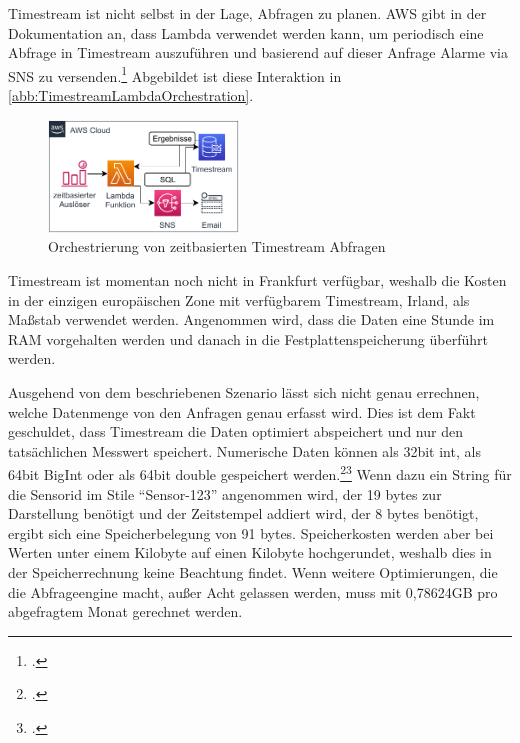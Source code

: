 Timestream ist nicht selbst in der Lage, Abfragen zu planen. \ac{AWS} gibt in der Dokumentation an, dass Lambda verwendet werden kann, um periodisch eine Abfrage in Timestream auszuführen und basierend auf dieser Anfrage Alarme via \ac{SNS} zu versenden.\footcite[Vgl.][]{AmazonWebServicesInc..o.J.ag} Abgebildet ist diese Interaktion in \autoref{abb:TimestreamLambdaOrchestration}.


\begin{figure}[H]
\centering
\includegraphics[width=0.45\textwidth]{graphics/Lambda-Timestream-Orchestration.pdf}
\caption{Orchestrierung von zeitbasierten Timestream Abfragen}
\label{abb:TimestreamLambdaOrchestration}
\end{figure}

Timestream ist momentan noch nicht in Frankfurt verfügbar, weshalb die Kosten in der einzigen europäischen Zone mit verfügbarem Timestream, Irland, als Maßstab verwendet werden. Angenommen wird, dass die Daten eine Stunde im \ac{RAM} vorgehalten werden und danach in die Festplattenspeicherung überführt werden.

Ausgehend von dem beschriebenen Szenario lässt sich nicht genau errechnen, welche Datenmenge von den Anfragen genau erfasst wird. Dies ist dem Fakt geschuldet, dass Timestream die Daten optimiert abspeichert und nur den tatsächlichen Messwert speichert. Numerische Daten können als 32bit int, als 64bit BigInt oder als 64bit double gespeichert werden.\footcite[Vgl. auch im Folgenden][]{AmazonWebServicesInc..o.J.r}\nzitat\footcite[Vgl. auch im Folgenden][]{AmazonWebServicesInc..o.J.q} Wenn dazu ein String für die Sensorid im Stile \enquote{Sensor-123} angenommen wird, der 19 bytes zur Darstellung benötigt und der Zeitstempel addiert wird, der 8 bytes benötigt, ergibt sich eine Speicherbelegung von 91 bytes. Speicherkosten werden aber bei Werten unter einem Kilobyte auf einen Kilobyte hochgerundet, weshalb dies in der Speicherrechnung keine Beachtung findet. Wenn weitere Optimierungen, die die Abfrageengine macht, außer Acht gelassen werden, muss mit 0,78624GB pro abgefragtem Monat gerechnet werden.


